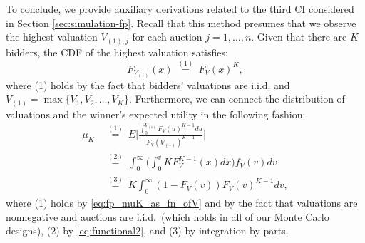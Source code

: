 To conclude, we provide auxiliary derivations related to the third CI considered in Section \ref{sec:simulation-fp}. Recall that this method presumes that we observe the highest valuation $V_{(1),j}$ for each auction $j=1,\dots,n$. Given that there are $K$ bidders, the CDF of the highest valuation satisfies:
\begin{equation}
F_{V_{( 1) }}( x )~\overset{(1)}{=}~F_{V}(x)^{K}, \label{eq:functional2}
\end{equation}
where (1) holds by the fact that bidders' valuations are i.i.d. and $V_{(1)} = \max\{V_1,V_2,\dots,V_K\}$. Furthermore, we can connect the distribution of valuations and the winner's expected utility in the following fashion:
\begin{align*}
\mu_K ~&\overset{(1)}{=}~E\bigg[\tfrac{ \int_{0}^{V_{(1)}}{F_{V}(u)^{K-1}}du}{F_{V}(V_{(1)})^{K-1}}\bigg]\\
~&\overset{(2)}{=}~
\int^{\infty}_{0} \bigg( \int_{0}^{v}K F_{V}^{K-1}( x) dx\bigg) f_{V}(v)dv \\
~&\overset{(3)}{=}~K\int^{\infty}_{0}  ( 1-F_{V}(v) ) F_{V}(v)^{K-1} dv, 
\end{align*}
where (1) holds by \eqref{eq:fp_muK_as_fn_ofV} and by the fact that valuations are nonnegative and auctions are i.i.d.\ (which holds in all of our Monte Carlo designs), (2) by \eqref{eq:functional2}, and (3) by integration by parts.


